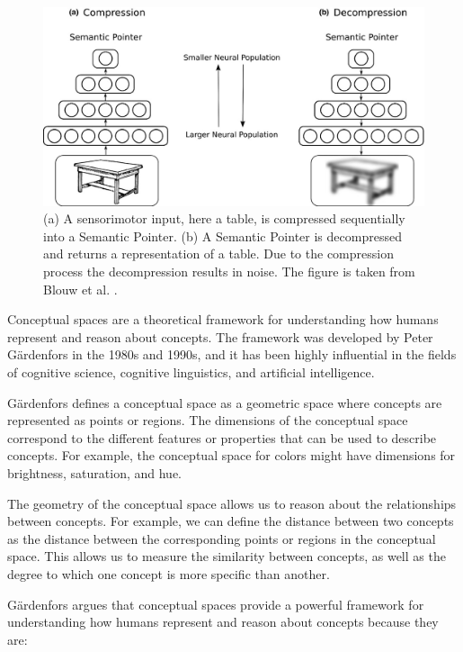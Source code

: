 \begin{figure}
    \centering
    \includegraphics[width=\textwidth]{../img/semPointer.jpg}
    \caption{(a) A sensorimotor input, here a table, is compressed sequentially into a Semantic Pointer. (b) A Semantic Pointer is decompressed and returns a representation of a table. Due to the compression process the decompression results in noise. The figure is taken from Blouw et al. \cite{blouw2016concepts}.}
    \label{fig:sp}
\end{figure}



Conceptual spaces are a theoretical framework for understanding how humans represent and reason about concepts. The framework was developed by Peter Gärdenfors in the 1980s and 1990s, and it has been highly influential in the fields of cognitive science, cognitive linguistics, and artificial intelligence. 

Gärdenfors defines a conceptual space as a geometric space where concepts are represented as points or regions. The dimensions of the conceptual space correspond to the different features or properties that can be used to describe concepts. For example, the conceptual space for colors might have dimensions for brightness, saturation, and hue.

The geometry of the conceptual space allows us to reason about the relationships between concepts. For example, we can define the distance between two concepts as the distance between the corresponding points or regions in the conceptual space. This allows us to measure the similarity between concepts, as well as the degree to which one concept is more specific than another.

Gärdenfors argues that conceptual spaces provide a powerful framework for understanding how humans represent and reason about concepts because they are:


